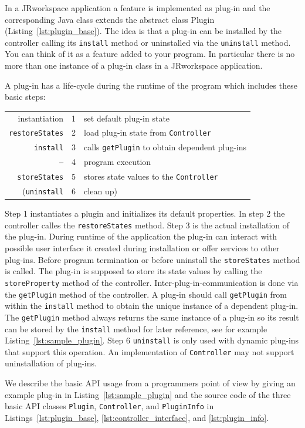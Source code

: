 \documentclass[Thesis.tex]{subfiles}
\begin{document}
In a {\sc JRworkspace} application a feature is implemented as plug-in and the corresponding Java class 
extends the abstract class Plugin
(Listing~\ref{lst:plugin_base}). The idea is that a plug-in can be installed by the controller 
calling its {\tt install} method or uninstalled via the {\tt uninstall} method. You can think of it 
as a feature added to your program. In particular there is no more than one instance of a
plug-in class in a {\sc JRworkspace} application.

A plug-in has a life-cycle during the runtime of the program which includes these basic
steps:
\begin{center}
\begin{tabular}{r|r|l}
	instantiation & 1 & set default plug-in state\\
	{\tt restoreStates} & 2 & load plug-in state from {\tt Controller}\\
	{\tt install} & 3 & calls {\tt getPlugin} to obtain dependent plug-ins\\
	{\tt --}  & 4 & program execution\\
	{\tt storeStates} & 5 & stores state values to the {\tt Controller}\\
	({\tt uninstall} & 6 & clean up)
\end{tabular}
\end{center}
Step 1 instantiates a plugin and initializes its default properties. In step 2 the controller 
calles the {\tt restoreStates} method. Step 3 is the actual installation of the plug-in. 
During runtime
of the application the plug-in can interact with possible user interface it created during 
installation or offer services to other plug-ins. 
Before program termination or before uninstall the {\tt storeStates} method is called. The plug-in
is supposed to store its state values by calling the {\tt storeProperty}
method of the controller.
Inter-plug-in-communication is done via the {\tt getPlugin} method of the controller. 
A plug-in should call {\tt getPlugin} from within the {\tt install} method to obtain the unique instance 
of a dependent plug-in. The {\tt getPlugin} method always returns the same instance of a plug-in so its
result can be stored by the {\tt install} method for later reference, see for example 
Listing~\ref{lst:sample_plugin}. Step 6 {\tt uninstall} is only used with dynamic plug-ins that support 
this operation. An implementation of {\tt Controller} may not support uninstallation of plug-ins.

We describe the basic API usage from a programmers point of view by giving an example plug-in
in Listing~\ref{lst:sample_plugin} and the source code of the three basic API classes 
{\tt Plugin}, {\tt Controller}, and {\tt PluginInfo} in Listings~\ref{lst:plugin_base}, 
\ref{lst:controller_interface}, and \ref{lst:plugin_info}.
\end{document}
